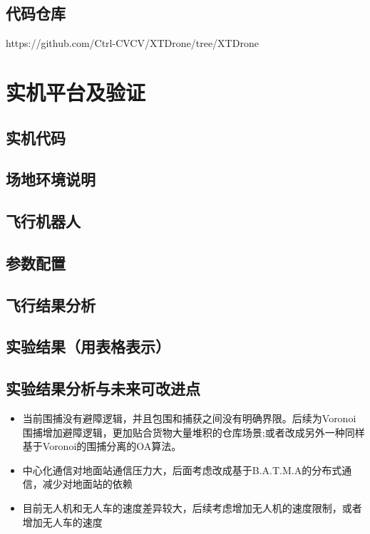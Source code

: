 \subsection{代码仓库}
https://github.com/Ctrl-CVCV/XTDrone/tree/XTDrone
\section{实机平台及验证}

\subsection{实机代码}

\subsection{场地环境说明}

\subsection{飞行机器人}

\subsection{参数配置}

\subsection{飞行结果分析}

\subsection{实验结果（用表格表示）}

\subsection{实验结果分析与未来可改进点}
\begin{itemize}
\item 当前围捕没有避障逻辑，并且包围和捕获之间没有明确界限。后续为Voronoi围捕增加避障逻辑，更加贴合货物大量堆积的仓库场景;或者改成另外一种同样基于Voronoi的围捕分离的OA算法。
\item 中心化通信对地面站通信压力大，后面考虑改成基于B.A.T.M.A的分布式通信，减少对地面站的依赖
\item 目前无人机和无人车的速度差异较大，后续考虑增加无人机的速度限制，或者增加无人车的速度
\end{itemize}